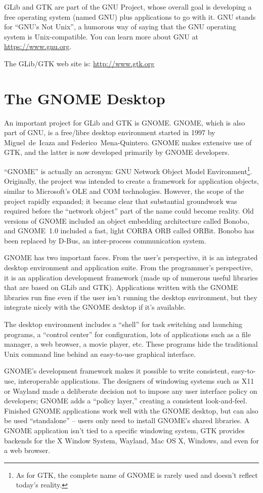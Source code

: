 GLib and GTK are part of the GNU Project, whose overall goal is developing a free operating system (named GNU) plus applications to go with it. GNU stands for ``GNU's Not Unix'', a humorous way of saying that the GNU operating system is Unix-compatible. You can learn more about GNU at \url{https://www.gnu.org}.

The GLib/GTK web site is: \url{http://www.gtk.org}

\section{The GNOME Desktop}

An important project for GLib and GTK is GNOME. GNOME, which is also part of GNU, is a free/libre desktop environment started in 1997 by Miguel~de~Icaza and Federico~Mena-Quintero. GNOME makes extensive use of GTK, and the latter is now developed primarily by GNOME developers.

``GNOME'' is actually an acronym: GNU Network Object Model Environment\footnote{As for GTK, the complete name of GNOME is rarely used and doesn't reflect today's reality.}. Originally, the project was intended to create a framework for application objects, similar to Microsoft's OLE and COM technologies. However, the scope of the project rapidly expanded; it became clear that substantial groundwork was required before the ``network object'' part of the name could become reality. Old versions of GNOME included an object embedding architecture called Bonobo, and GNOME~1.0 included a fast, light CORBA ORB called ORBit. Bonobo has been replaced by D-Bus, an inter-process communication system.

GNOME has two important faces. From the user's perspective, it is an integrated desktop environment and application suite. From the programmer's perspective, it is an application development framework (made up of numerous useful libraries that are based on GLib and GTK). Applications written with the GNOME libraries run fine even if the user isn't running the desktop environment, but they integrate nicely with the GNOME desktop if it's available.

The desktop environment includes a ``shell'' for task switching and launching programs, a ``control center'' for configuration, lots of applications such as a file manager, a web browser, a movie player, etc. These programs hide the traditional Unix command line behind an easy-to-use graphical interface.

GNOME's development framework makes it possible to write consistent, easy-to-use, interoperable applications. The designers of windowing systems such as X11 or Wayland made a deliberate decision not to impose any user interface policy on developers; GNOME adds a ``policy layer,'' creating a consistent look-and-feel. Finished GNOME applications work well with the GNOME desktop, but can also be used ``standalone'' -- users only need to install GNOME's shared libraries. A GNOME application isn't tied to a specific windowing system, GTK provides backends for the X Window System, Wayland, Mac OS X, Windows, and even for a web browser.

